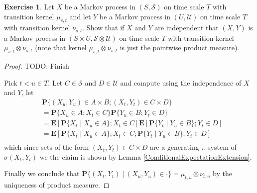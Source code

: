 \documentclass{amsbook}
\theoremstyle{definition}
\newtheorem{xca}{Exercise}
\theoremstyle{remark}
\newcommand{\expectation}[1]{\textbf{E}\left[#1\right]}
\newcommand{\probability}[1]{\textbf{P}\{#1\}}
\newcommand{\cprobability}[2]{\textbf{P}\{#2 \mid #1\}}
\begin{document}
\begin{xca}\label{ProductOfIndependentMarkov}Let $X$ be a Markov process in $(S, \mathcal{S})$  on time scale $T$ with
  transition kernel $\mu_{s,t}$ and
  let $Y$ be a Markov process in $(U, \mathcal{U})$ on time scale $T$ with 
  transition kernel $\nu_{s,t}$.  Show that if $X$ and $Y$ are
  independent
  that $(X,Y)$ is a Markov process in $(S \times U, \mathcal{S}
  \otimes \mathcal{U})$ on time scale $T$ with transition kernel $\mu_{s,t}
  \otimes \nu_{s,t}$ (note that kernel $\mu_{s,t}
  \otimes \nu_{s,t}$ is just the pointwise product measure).
\end{xca}
\begin{proof}
TODO: Finish

Pick $t < u \in T$.  Let $C \in \mathcal{S}$ and $D \in \mathcal{U}$ and compute using the
independence of $X$ and $Y$, let
\begin{align*}
&\probability{(X_u,Y_u) \in A \times B ; (X_t, Y_t) \in C
  \times D} \\
&=\probability{X_u \in A ; X_t \in C} \probability{Y_u \in B ; Y_t \in  D} \\
&=\expectation{\cprobability{X_u \in A}{X_t} ; X_t \in C}
\expectation{\cprobability{Y_u \in B}{Y_t} ;  Y_t \in  D} \\
&=\expectation{\cprobability{X_u \in A}{X_t} ; X_t \in C;
\cprobability{Y_u \in B}{Y_t} ;  Y_t \in  D} \\
\end{align*}
which since sets of the form $ (X_t, Y_t) \in C
  \times D$ are a generating
$\pi$-system of $\sigma(X_t,Y_t)$ we the claim is shown by Lemma
\ref{ConditionalExpectationExtension}.

Finally we conclude that $\cprobability{(X_u, Y_u) \in
  \cdot}{(X_t,Y_t)} = \mu_{t,u} \otimes \nu_{t,u}$ 
by the uniqueness of product measure.
\end{proof}
\end{document}
